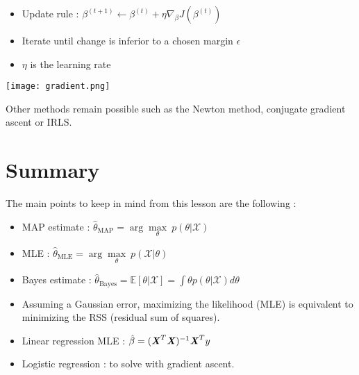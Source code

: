 \documentclass[a4paper,12pt]{article}
\begin{document}
\begin{itemize}
\item Update rule : \(\beta^{(t+1)} \leftarrow \beta^{(t)} + \eta \nabla_\beta J(\beta^{(t)})\)
\item Iterate until change is inferior to a chosen margin $\epsilon$
\item $\eta$ is the learning rate
\end{itemize}

\begin{center}
\texttt{[image: gradient.png]}
\end{center}
Other methods remain possible such as the Newton method, conjugate gradient ascent or IRLS.


\section{Summary}

The main points to keep in mind from this lesson are the following :
\begin{itemize}
\item MAP estimate : \(\hat{\theta}_{\mbox{MAP}}=\arg\underset{\theta}\max \  p(\theta|\mathcal{X})\)
\item MLE : \(\hat{\theta}_{\mbox{MLE}}=\arg\underset{\theta}\max \  p(\mathcal{X}|\theta)\)
\item Bayes estimate : \(\hat{\theta}_{\mbox{Bayes}}=\mathbb{E}[\theta|\mathcal{X}]=\int{\!\theta p(\theta|\mathcal{X})d\theta}\)
\item Assuming a Gaussian error, maximizing the likelihood (MLE) is equivalent to minimizing the RSS (residual sum of squares).
\item Linear regression MLE : \(\hat{\beta} = (\textbf{\textit{X}}^T\textbf{\textit{X}})^{-1} \textbf{\textit{X}}^T y\)
\item Logistic regression : to solve with gradient ascent.
 \end{itemize}
\end{document}
